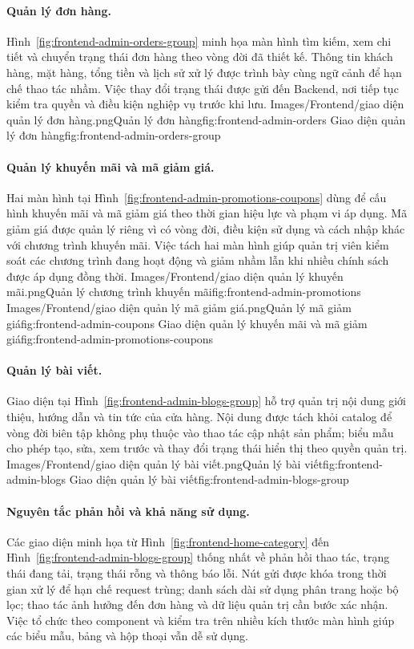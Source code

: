 \paragraph{Quản lý đơn hàng.}

Hình~\ref{fig:frontend-admin-orders-group} minh họa màn hình tìm kiếm, xem chi tiết và chuyển trạng thái đơn hàng theo vòng đời đã thiết kế.
Thông tin khách hàng, mặt hàng, tổng tiền và lịch sử xử lý được trình bày cùng ngữ cảnh để hạn chế
thao tác nhầm. Việc thay đổi trạng thái được gửi đến Backend, nơi tiếp tục kiểm tra quyền và điều
kiện nghiệp vụ trước khi lưu.
\frontendsingle
{Images/Frontend/giao diện quản lý đơn hàng.png}{Quản lý đơn hàng}{fig:frontend-admin-orders}
{Giao diện quản lý đơn hàng}{fig:frontend-admin-orders-group}

\paragraph{Quản lý khuyến mãi và mã giảm giá.}

Hai màn hình tại Hình~\ref{fig:frontend-admin-promotions-coupons} dùng để cấu hình khuyến mãi và mã giảm giá theo thời gian hiệu lực và phạm vi áp
dụng. Mã giảm giá được quản lý riêng vì có vòng đời, điều kiện sử dụng và cách nhập khác với chương
trình khuyến mãi. Việc tách hai màn hình giúp quản trị viên kiểm soát các chương trình đang hoạt động
và giảm nhầm lẫn khi nhiều chính sách được áp dụng đồng thời.
\frontendpair
{Images/Frontend/giao diện quản lý khuyến mãi.png}{Quản lý chương trình khuyến mãi}{fig:frontend-admin-promotions}
{Images/Frontend/giao diện quản lý mã giảm giá.png}{Quản lý mã giảm giá}{fig:frontend-admin-coupons}
{Giao diện quản lý khuyến mãi và mã giảm giá}{fig:frontend-admin-promotions-coupons}

\paragraph{Quản lý bài viết.}

Giao diện tại Hình~\ref{fig:frontend-admin-blogs-group} hỗ trợ quản trị nội dung giới thiệu, hướng dẫn và tin tức của cửa hàng. Nội dung
được tách khỏi catalog để vòng đời biên tập không phụ thuộc vào thao tác cập nhật sản phẩm; biểu mẫu
cho phép tạo, sửa, xem trước và thay đổi trạng thái hiển thị theo quyền quản trị.
\frontendsingle
{Images/Frontend/giao diện quản lý bài viết.png}{Quản lý bài viết}{fig:frontend-admin-blogs}
{Giao diện quản lý bài viết}{fig:frontend-admin-blogs-group}

\paragraph{Nguyên tắc phản hồi và khả năng sử dụng.}

Các giao diện minh họa từ Hình~\ref{fig:frontend-home-category} đến Hình~\ref{fig:frontend-admin-blogs-group}
thống nhất về phản hồi thao tác, trạng thái đang tải, trạng thái rỗng và thông báo lỗi.
Nút gửi được khóa trong thời gian xử lý để hạn chế request trùng; danh sách dài sử dụng phân trang
hoặc bộ lọc; thao tác ảnh hưởng đến đơn hàng và dữ liệu quản trị cần bước xác nhận. Việc tổ chức theo
component và kiểm tra trên nhiều kích thước màn hình giúp các biểu mẫu, bảng và hộp thoại vẫn dễ sử dụng.
